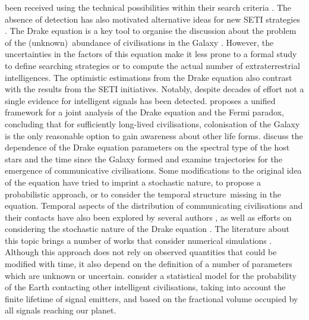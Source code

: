 \documentclass[crop]{CSLB}
\begin{document}
been received using the technical possibilities within their search
criteria \citep{tarter_search_2001}.
%
The absence of detection has also motivated alternative ideas for new
SETI strategies \citep{forgan_exoplanet_2017, balbi_impact_2018,
loeb_eavesdropping_2006, maccone_KLT_2010, tarter_advancing_2009,
enriquez_breakthrough_2017, loeb_relative_2016, maccone_SETI_2011,
lingam_relative_2019, wright_theGsearch_2015, maccone_SETI_2013,
maccone_lognormals_2014, harp_application_2018,
forgan_possibility_2013, forgan_galactic_2017, funes_searching_2019}.
%
\Fpagebreak
%
The Drake equation is a key tool to organise the discussion about the
problem of the (unknown) abundance of civilisations in the Galaxy
\citep{hinkel_interdisciplinary_2019}.
%
However, the uncertainties in the factors of this equation make it
less prone to a formal study to define searching strategies or to
compute the actual number of extraterrestrial intelligences.
%
The optimistic estimations from the Drake equation also contrast with
the results from the SETI initiatives.
%
Notably, despite decades of effort not a single evidence for
intelligent signals has been detected.
%
\citet{prantzos_joint_2013} proposes a unified framework for a joint
analysis of the Drake equation and the Fermi paradox, concluding that
for sufficiently long-lived civilisations, colonisation of the Galaxy
is the only reasonable option to gain awareness about other life
forms.
%
\citet{haqq-misra_drake_2017} discuss the dependence of the Drake
equation parameters on the spectral type of the host stars and the
time since the Galaxy formed and examine trajectories for the
emergence of communicative civilisations.
%
Some modifications to the original idea of the equation have tried to
imprint a stochastic nature, to propose a probabilistic approach, or
to consider the temporal structure missing in the equation.
%
Temporal aspects of the distribution of communicating civilisations
and their contacts have also been explored by several authors
\citep{fogg_temporal_1987, forgan_spatiotemporal_2011,
balbi_impact_2018, balb_spatiotemporal_2018, horvat_impact_2011}, as
well as efforts on considering the stochastic nature of the Drake
equation \citep{glade_stochastic_2011}.
%
The literature about this topic brings a number of works that consider
numerical simulations \citep{forgan_evaluating_2015,
vukotic_grandeur_2016, murante_simulating_2015, forgan_numerical_2009,
forgan_galactic_2017, ramirez_new_2017}.
%
Although this approach does not rely on observed quantities that could
be modified with time, it also depend on the definition of a number of
parameters which are unknown or uncertain.
%
\citet{grimaldi_signal_2017} consider a statistical model for the
probability of the Earth contacting other intelligent civilisations,
taking into account the finite lifetime of signal emitters, and based
on the fractional volume occupied by all signals reaching our planet.
\end{document}
